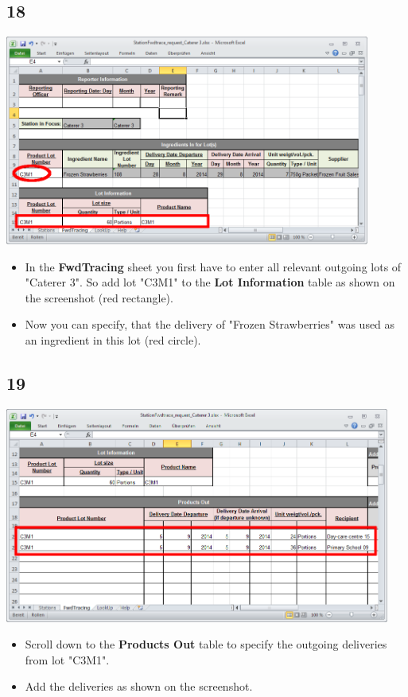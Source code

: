 \documentclass{beamer}
\begin{document}
\subsection{18}
\begin{frame}
	\begin{center}
  		\includegraphics[width=0.9\textwidth]{18.png}
	\end{center}
	\begin{itemize}
		\item In the \textbf{FwdTracing} sheet you first have to enter all relevant outgoing lots of "Caterer 3". So add lot "C3M1" to the \textbf{Lot Information} table as shown on the screenshot (red rectangle).
		\item Now you can specify, that the delivery of "Frozen Strawberries" was used as an ingredient in this lot (red circle).
	\end{itemize}
\end{frame}

\subsection{19}
\begin{frame}
	\begin{center}
  		\includegraphics[width=0.95\textwidth]{19.png}
	\end{center}
	\begin{itemize}
		\item Scroll down to the \textbf{Products Out} table to specify the outgoing deliveries from lot "C3M1".
		\item Add the deliveries as shown on the screenshot.
	\end{itemize}
\end{frame}
\end{document}
